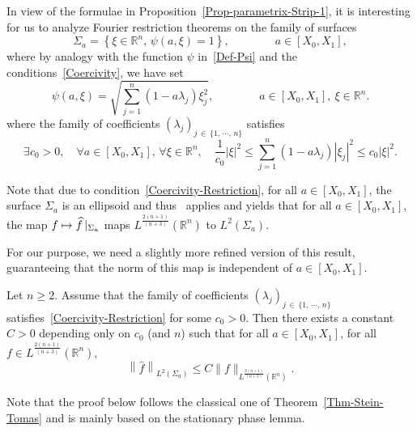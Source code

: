 \documentclass[AHL,Unicode,longabstracts]{cedram}
\newcommand*\R{\mathbb{R}}
\renewcommand{\leq}{\leqslant}
\renewcommand{\geq}{\geqslant}
\renewcommand{\hat}{\widehat}
\let\oldhat\hat
\renewcommand*{\hat}[1]{\mathchoice{\widehat{#1}}{\widehat{#1}}{\oldhat{#1}}{\oldhat{#1}}}
\let\oldexists\exists
\renewcommand*{\exists}{\mathrel{\oldexists}}
\let\oldforall\forall
\renewcommand*{\forall}{\mathrel{\oldforall}}
\begin{document}
In view of the formulae in Proposition~\ref{Prop-parametrix-Strip-1}, it is interesting for us to analyze Fourier restriction theorems on the family of surfaces
\begin{equation}\label{Def-Sigma-a}
\Sigma_{a} = \left\{ \xi \in \R^n, \, \psi(a, \xi) = 1\right\}, \qquad \qquad a \in [X_0, X_1],
\end{equation}
where by analogy with the function $\psi$ in~\eqref{Def-Psi} and the conditions~\eqref{Coercivity}, we have set
\begin{equation}\label{Def-Psi-R-n}
\psi(a, \xi)=\sqrt{ \sum_{j=1}^{n}(1-a \lambda_{j}) \xi_{j} ^2},
\qquad \qquad a \in [X_0,X_1], \ \xi \in \R^{n}.
\end{equation}
where the family of coefficients $(\lambda_j)_{j\, \in\,\{1,\,\cdots,\,n\}}$ satisfies
\begin{equation}\label{Coercivity-Restriction}
\exists c_0 >0, \quad \forall a \in [X_0, X_1], \, \forall \xi \in \R^{n}, \quad
\frac{1}{c_0} | \xi|^2
\leq
\sum_{j =1}^n \left(1 - a \lambda_j\right) \left|\xi_j\right|^2
\leq c_0 |\xi|^2.
\end{equation}

Note that due to condition~\eqref{Coercivity-Restriction}, for all $a\in [X_0, X_1]$, the surface $\Sigma_{a}$ is an ellipsoid and thus~\cite[Corollary~2.2.2]{sogge2017fourier} applies and yields that for all $a \in [X_0, X_1]$, the map $f \mapsto \hat f\,|_{\Sigma_{a}} $ maps $L^{\frac{2(n+1)}{(n+3)}} (\R^n)$ to $L^2(\Sigma_{a})$.

For our purpose, we need a slightly more refined version of this result, guaranteeing that the norm of this map is independent of $a \in [X_0, X_1]$.
\begin{theo}\label{Thm-Fourier-Rest-Sigma-x-1}
Let $n \geq 2$. Assume that the family of coefficients $(\lambda_j)_{j\, \in\,\{1,\, \cdots,\,n\}}$ satisfies~\eqref{Coercivity-Restriction} for some $c_0 >0$. Then there exists a constant $C>0$ depending only on $c_0$ (and $n$) such that for all $a \in [X_0, X_1]$, for all $f \in L^{\frac{2(n+1)}{(n+3)}}(\R^n)$,
\begin{equation}\label{Uniform-Restriction-Thm}
\left\| \widehat f\right \|_{L^2(\Sigma_{a})} \leqslant C \|f\|_{L^{\frac{2(n+1)}{(n+3)}}\left(\R^n\right)}.
\end{equation}
\end{theo}

Note that the proof below follows the classical one of Theorem~\ref{Thm-Stein-Tomas} and is mainly based on the stationary phase lemma.
\end{document}
